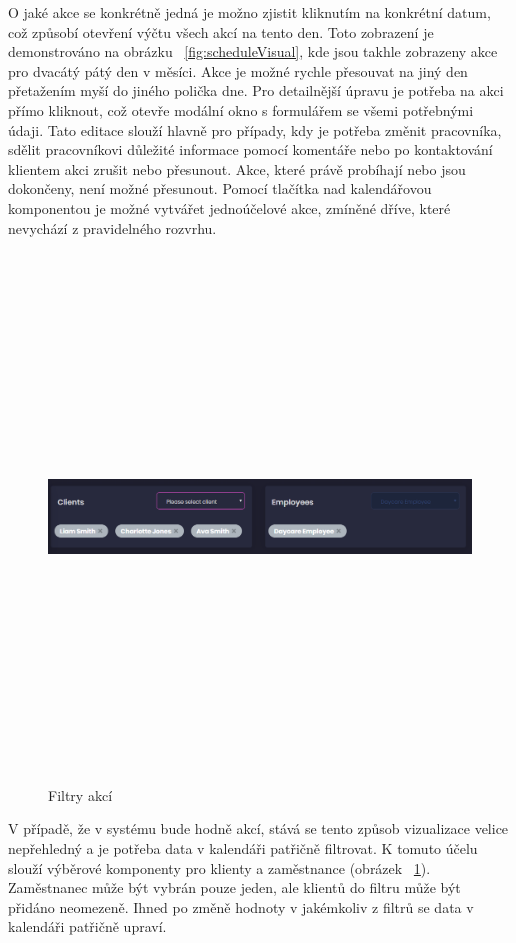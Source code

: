 \documentclass[
  glossaries,
]{kidiplom}
\begin{document}
O jaké akce se konkrétně jedná je možno zjistit kliknutím na konkrétní datum, což způsobí otevření výčtu všech akcí na tento den. Toto zobrazení je demonstrováno na obrázku ~\ref{fig:scheduleVisual}, kde jsou takhle zobrazeny akce pro dvacátý pátý den v měsíci. Akce je možné rychle přesouvat na jiný den přetažením myší do jiného polička dne. Pro detailnější úpravu je potřeba na akci přímo kliknout, což otevře modální okno s formulářem se všemi potřebnými údaji. Tato editace slouží hlavně pro případy, kdy je potřeba změnit pracovníka, sdělit pracovníkovi důležité informace pomocí komentáře nebo po kontaktování klientem akci zrušit nebo přesunout. Akce, které právě probíhají nebo jsou dokončeny, není možné přesunout. Pomocí tlačítka nad kalendářovou komponentou je možné vytvářet jednoúčelové akce, zmíněné dříve, které nevychází z pravidelného rozvrhu.

\begin{figure}[H]
  	\centering
 	 \includegraphics[width=14cm,height=14cm,keepaspectratio]{schedule_filters}
 	 \caption{Filtry akcí}
 	 \label{fig:scheduleFilter}
\end{figure}

V případě, že v systému bude hodně akcí, stává se tento způsob vizualizace velice nepřehledný a je potřeba data v kalendáři patřičně filtrovat. K tomuto účelu slouží výběrové komponenty pro klienty a zaměstnance (obrázek ~\ref{fig:scheduleFilter}). Zaměstnanec může být vybrán pouze jeden, ale klientů do filtru může být přidáno neomezeně. Ihned po změně hodnoty v jakémkoliv z filtrů se data v kalendáři patřičně upraví.
\end{document}
